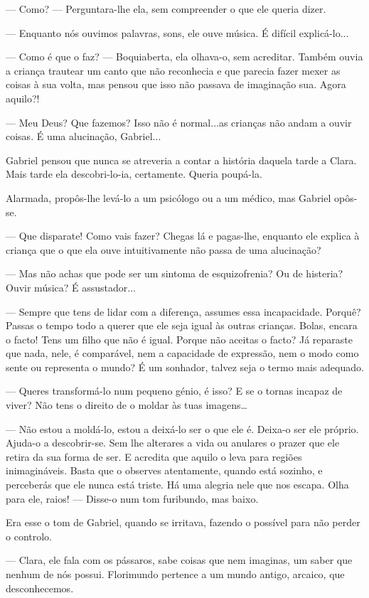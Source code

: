 --- Como? --- Perguntara-lhe ela, sem compreender o que ele queria dizer.

--- Enquanto nós ouvimos palavras, sons, ele ouve música. É difícil
explicá-lo...

--- Como é que o faz? --- Boquiaberta, ela olhava-o, sem acreditar. Também
ouvia a criança trautear um canto que não reconhecia e que parecia fazer
mexer as coisas à sua volta, mas pensou que isso não passava de
imaginação sua. Agora aquilo?!

--- Meu Deus? Que fazemos? Isso não é normal...as crianças não andam a
ouvir coisas. É uma alucinação, Gabriel...

Gabriel pensou que nunca se atreveria a contar a história daquela tarde
a Clara. Mais tarde ela descobri-lo-ia, certamente. Queria poupá-la.

Alarmada, propôs-lhe levá-lo a um psicólogo ou a um médico, mas Gabriel
opôs-se.

--- Que disparate! Como vais fazer? Chegas lá e pagas-lhe, enquanto ele
explica à criança que o que ela ouve intuitivamente não passa de uma
alucinação?

--- Mas não achas que pode ser um sintoma de esquizofrenia? Ou de
histeria? Ouvir música? É assustador...

--- Sempre que tens de lidar com a diferença, assumes essa incapacidade.
Porquê? Passas o tempo todo a querer que ele seja igual às outras
crianças. Bolas, encara o facto! Tens um filho que não é igual. Porque
não aceitas o facto? Já reparaste que nada, nele, é comparável, nem a
capacidade de expressão, nem o modo como sente ou representa o mundo? É
um sonhador, talvez seja o termo mais adequado.

--- Queres transformá-lo num pequeno génio, é isso? E se o tornas incapaz
de viver? Não tens o direito de o moldar às tuas imagens\ldots{}

--- Não estou a moldá-lo, estou a deixá-lo ser o que ele é. Deixa-o ser
ele próprio. Ajuda-o a descobrir-se. Sem lhe alterares a vida ou
anulares o prazer que ele retira da sua forma de ser. E acredita que
aquilo o leva para regiões inimagináveis. Basta que o observes
atentamente, quando está sozinho, e perceberás que ele nunca está
triste. Há uma alegria nele que nos escapa. Olha para ele, raios! ---
Disse-o num tom furibundo, mas baixo.

Era esse o tom de Gabriel, quando se irritava, fazendo o possível para
não perder o controlo.

--- Clara, ele fala com os pássaros, sabe coisas que nem imaginas, um
saber que nenhum de nós possui. Florimundo pertence a um mundo antigo,
arcaico, que desconhecemos.

